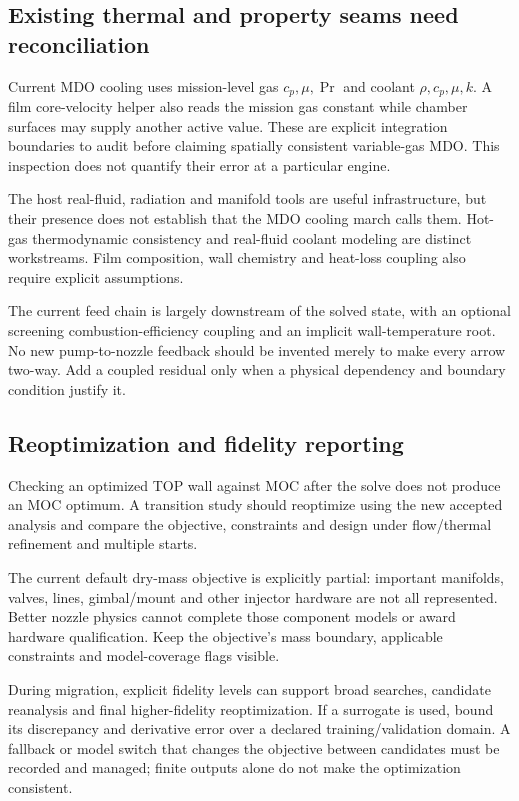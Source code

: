 \subsection{Existing thermal and property seams need reconciliation}
Current MDO cooling uses mission-level gas \(c_p,\mu,\Pr\) and coolant
\(\rho,c_p,\mu,k\). A film core-velocity helper also reads the mission gas
constant while chamber surfaces may supply another active value.
These are explicit integration boundaries to audit before claiming
spatially consistent variable-gas MDO. This inspection does not quantify
their error at a particular engine.

The host real-fluid, radiation and manifold tools are useful
infrastructure, but their presence does not establish that the MDO
cooling march calls them. Hot-gas thermodynamic consistency and
real-fluid coolant modeling are distinct workstreams. Film composition,
wall chemistry and heat-loss coupling also require explicit assumptions.

The current feed chain is largely downstream of the solved state,
with an optional screening combustion-efficiency coupling and an
implicit wall-temperature root. No new pump-to-nozzle feedback should
be invented merely to make every arrow two-way. Add a coupled residual
only when a physical dependency and boundary condition justify it.

\subsection{Reoptimization and fidelity reporting}
Checking an optimized TOP wall against MOC after the solve does not
produce an MOC optimum. A transition study should reoptimize using the
new accepted analysis and compare the objective, constraints and
design under flow/thermal refinement and multiple starts.

The current default dry-mass objective is explicitly partial: important
manifolds, valves, lines, gimbal/mount and other injector hardware are
not all represented. Better nozzle physics cannot complete those
component models or award hardware qualification. Keep the objective's
mass boundary, applicable constraints and model-coverage flags visible.

During migration, explicit fidelity levels can support broad searches,
candidate reanalysis and final higher-fidelity reoptimization. If a
surrogate is used, bound its discrepancy and derivative error over a
declared training/validation domain. A fallback or model switch that
changes the objective between candidates must be recorded and managed;
finite outputs alone do not make the optimization consistent.
